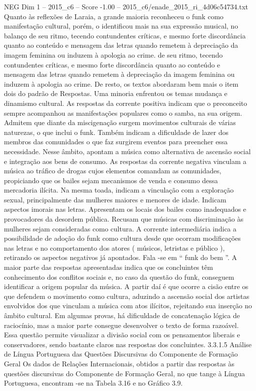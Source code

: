 \begin{textsample}{NEG Dim 1 – 2015\_c6 – Score -1.00 – 2015\_c6/enade\_2015\_ri\_4d06c54734.txt}
Quanto às reflexões de Laraia, a grande maioria reconheceu o funk como manifestação cultural, porém, o identificou mais na sua expressão musical, no balanço de seu ritmo, tecendo contundentes críticas, e mesmo forte discordância quanto ao conteúdo e mensagem das letras quando remetem à depreciação da imagem feminina ou induzem à apologia ao crime. de seu ritmo, tecendo contundentes críticas, e mesmo forte discordância quanto ao conteúdo e mensagem das letras quando remetem à depreciação da imagem feminina ou induzem à apologia ao crime.
De resto, os textos abordaram bem mais o item dois do padrão de Respostas.
Uma minoria enfrentou os temas mudança e dinamismo cultural.
As respostas da corrente positiva indicam que o preconceito sempre acompanhou as manifestações populares como o samba, na sua origem.
Admitem que diante da miscigenação surgem movimentos culturais de várias naturezas, o que inclui o funk.
Também indicam a dificuldade de lazer dos membros das comunidades o que faz surgirem eventos para preencher essa necessidade.
Nesse âmbito, apontam a música como alternativa de ascensão social e integração aos bens de consumo.
As respostas da corrente negativa vinculam a música ao tráfico de drogas cujos elementos comandam as comunidades, propiciando que os bailes sejam mecanismos de venda e consumo dessa mercadoria ilícita.
Na mesma toada, indicam a vinculação com a exploração sexual, principalmente das mulheres maiores e menores de idade.
Indicam aspectos imorais nas letras.
Apresentam os locais dos bailes como inadequados e provocadores da desordem pública.
Recusam que músicas com discriminação às mulheres sejam consideradas como cultura.
A corrente intermediária indica a possibilidade de adoção do funk como cultura desde que ocorram modificações nas letras e no comportamento dos atores ( músicos, letristas e público ), retirando os aspectos negativos já apontados.
Fala -se em “ funk do bem ”.
A maior parte das respostas apresentadas indica que os concluintes têm conhecimento dos conflitos sociais e, no caso da questão do funk, conseguem identificar a origem popular da música.
A partir daí é que ocorre a cisão entre os que defendem o movimento como cultura, aduzindo a ascensão social dos artistas envolvidos dos que vinculam a música com atos ilícitos, rejeitando sua inserção no âmbito cultural.
Em algumas provas, há dificuldade de concatenação lógica de raciocínio, mas a maior parte consegue desenvolver o texto de forma razoável.
Essa questão permite visualizar a divisão social com os pensamentos liberais e conservadores, sendo bastante claros nas respostas dos concluintes. 3.3.1.5 Análise de Língua Portuguesa das Questões Discursivas do Componente de Formação Geral Os dados de Relações Internacionais, obtidos a partir das respostas às questões discursivas do Componente de Formação Geral, no que tange à Língua Portuguesa, encontram -se na Tabela 3.16 e no Gráfico 3.9.

\end{textsample}
